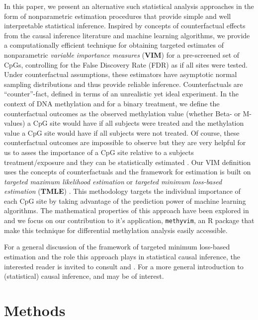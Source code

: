 \documentclass[9pt,a4paper,]{extarticle}
\theoremstyle{definition}
\theoremstyle{definition}
\theoremstyle{definition}
\theoremstyle{remark}
\begin{document}
In this paper, we present an alternative such statistical analysis approaches in
the form of nonparametric estimation procedures that provide simple and well
interpretable statistical inference. Inspired by concepts of counterfactual
effects from the causal inference literature and machine learning algorithms, we
provide a computationally efficient technique for obtaining targeted estimates
of nonparametric \emph{variable importance measures} (\textbf{VIM}) for a pre-screened set
of CpGs, controlling for the False Discovery Rate (FDR) as if all sites were
tested. Under counterfactual assumptions, these estimators have asymptotic
normal sampling distributions and thus provide reliable inference.
Counterfactuals are ``counter''-fact, defined in terms of an unrealistic yet ideal
experiment. In the context of DNA methylation and for a binary treatment, we
define the counterfactual outcomes as the observed methylation value (whether
Beta- or M-values) a CpG site would have if all subjects were treated and the
methylation value a CpG site would have if all subjects were not treated. Of
course, these counterfactual outcomes are impossible to observe but they are
very helpful for us to asses the importance of a CpG site relative to a subjects
treatment/exposure and they can be statistically estimated
\citep{vdl2006statistical}. Our VIM definition uses the concepts of counterfactuals
and the framework for estimation is built on \emph{targeted maximum likelihood
estimation} or \emph{targeted minimum loss-based estimation} (\textbf{TMLE})
\citep{vdl2006targeted}. This methodology targets the individual importance of each
CpG site by taking advantage of the prediction power of machine learning
algorithms. The mathematical properties of this approach have been explored in
\citep{tuglus2008targeted} and we focus on our contribution to it's application,
\texttt{methyvim}, an R package that make this technique for differential methylation
analysis easily accessible.

For a general discussion of the framework of targeted minimum loss-based
estimation and the role this approach plays in statistical causal inference, the
interested reader is invited to consult \citet{vdl2011targeted} and \citet{vdl2017targeted}.
For a more general introduction to (statistical) causal inference,
\citet{pearl2009causality} and \citet{hernan2018causal} may be of interest.

\hypertarget{methods}{%
\section{Methods}\label{methods}}
\end{document}
